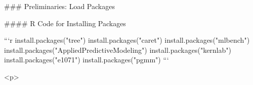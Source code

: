 

### Preliminaries: Load  Packages

#### R Code for Installing Packages


```{r}
install.packages("tree")
install.packages("caret")
install.packages("mlbench")
install.packages("AppliedPredictiveModeling")
install.packages("kernlab")
install.packages("e1071")
install.packages("pgmm")
```



<p>
